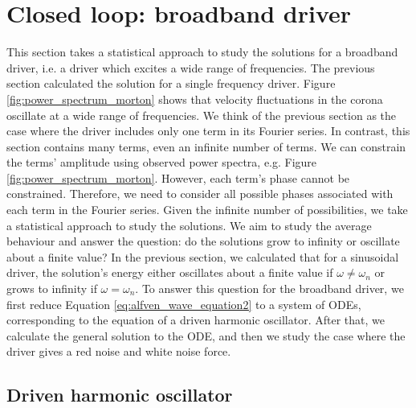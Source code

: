 \section{Closed loop: broadband driver}
\label{sec:closed_loop_random_driver}

This section takes a statistical approach to study the solutions for a broadband driver, i.e. a driver which excites a wide range of frequencies. The previous section calculated the solution for a single frequency driver. Figure \ref{fig:power_spectrum_morton} shows that velocity fluctuations in the corona oscillate at a wide range of frequencies. We think of the previous section as the case where the driver includes only one term in its Fourier series. In contrast, this section contains many terms, even an infinite number of terms. We can constrain the terms' amplitude using observed power spectra, e.g. Figure \ref{fig:power_spectrum_morton}. However, each term's phase cannot be constrained. Therefore, we need to consider all possible phases associated with each term in the Fourier series. Given the infinite number of possibilities, we take a statistical approach to study the solutions. We aim to study the average behaviour and answer the question: do the solutions grow to infinity or oscillate about a finite value? In the previous section, we calculated that for a sinusoidal driver, the solution's energy either oscillates about a finite value if $\omega\ne\omega_n$ or grows to infinity if $\omega=\omega_n$. To answer this question for the broadband driver, we first reduce Equation \eqref{eq:alfven_wave_equation2} to a system of ODEs, corresponding to the equation of a driven harmonic oscillator. After that, we calculate the general solution to the ODE, and then we study the case where the driver gives a red noise and white noise force.

\subsection{Driven harmonic oscillator}
\label{sec:chap_2_driven_harmonic_oscillator}

